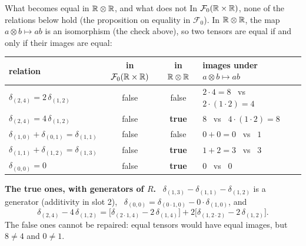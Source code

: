 \documentclass[aspectratio=1610,11pt]{beamer}
\begin{document}
\begin{frame}{What becomes equal in $\mathbb{R} \otimes \mathbb{R}$, and what does not}
    \small
    In $\mathcal{F}_0(\mathbb{R} \times \mathbb{R})$, none of the relations below hold (the proposition on equality in $\mathcal{F}_0$). In $\mathbb{R} \otimes \mathbb{R}$, the map $a \otimes b \mapsto ab$ is an isomorphism (the check above), so two tensors are equal if and only if their images are equal:
    \begin{center}
        \renewcommand{\arraystretch}{1.15}
        \begin{tabular}{l|c|c|l}
            relation & in $\mathcal{F}_0(\mathbb{R} \times \mathbb{R})$ & in $\mathbb{R} \otimes \mathbb{R}$ & images under $a \otimes b \mapsto ab$ \\ \hline
            $\delta_{(2, 4)} = 2\,\delta_{(1, 2)}$ & false & false & $2 \cdot 4 = 8$ \ vs \ $2 \cdot (1 \cdot 2) = 4$ \\
            $\delta_{(2, 4)} = 4\,\delta_{(1, 2)}$ & false & \textbf{true} & $8$ \ vs \ $4 \cdot (1 \cdot 2) = 8$ \\
            $\delta_{(1, 0)} + \delta_{(0, 1)} = \delta_{(1, 1)}$ & false & false & $0 + 0 = 0$ \ vs \ $1$ \\
            $\delta_{(1, 1)} + \delta_{(1, 2)} = \delta_{(1, 3)}$ & false & \textbf{true} & $1 + 2 = 3$ \ vs \ $3$ \\
            $\delta_{(0, 0)} = 0$ & false & \textbf{true} & $0$ \ vs \ $0$
        \end{tabular}
    \end{center}
    \textbf{The true ones, with generators of $R$.} \ $\delta_{(1, 3)} - \delta_{(1, 1)} - \delta_{(1, 2)}$ is a generator (additivity in slot 2), \ $\delta_{(0, 0)} = \delta_{(0 \cdot 1, 0)} - 0 \cdot \delta_{(1, 0)}$, and
    \[\delta_{(2, 4)} - 4\,\delta_{(1, 2)} = \big[\delta_{(2 \cdot 1, 4)} - 2\,\delta_{(1, 4)}\big] + 2\big[\delta_{(1, 2 \cdot 2)} - 2\,\delta_{(1, 2)}\big].\]
    The false ones cannot be repaired: equal tensors would have equal images, but $8 \neq 4$ and $0 \neq 1$.
\end{frame}
\end{document}
